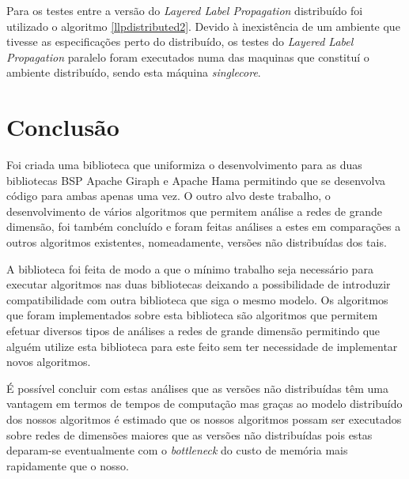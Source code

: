 Para os testes entre a versão do \textit{Layered Label Propagation} distribuído 
foi utilizado o algoritmo \ref{llpdistributed2}. Devido à inexistência de um 
ambiente que tivesse as especificações perto do distribuído, os testes do 
\textit{Layered Label Propagation} paralelo foram executados numa das maquinas 
que constituí o ambiente distribuído, sendo esta máquina \textit{singlecore}.

\chapter{Conclusão}
Foi criada uma biblioteca que uniformiza o desenvolvimento para as duas bibliotecas BSP Apache Giraph e Apache Hama permitindo que se desenvolva código para ambas apenas uma vez. O outro alvo deste trabalho, o desenvolvimento de vários algoritmos que permitem análise a redes de grande dimensão, foi também concluído e foram feitas análises a estes em comparações a outros algoritmos existentes, nomeadamente, versões não distribuídas dos tais.

A biblioteca foi feita de modo a que o mínimo trabalho seja necessário para executar algoritmos nas duas bibliotecas deixando a possibilidade de introduzir compatibilidade com outra biblioteca que siga o mesmo modelo. Os algoritmos que foram implementados sobre esta biblioteca são algoritmos que permitem efetuar diversos tipos de análises a redes de grande dimensão permitindo que alguém utilize esta biblioteca para este feito sem ter necessidade de implementar novos algoritmos.

É possível concluir com estas análises que as versões não distribuídas têm uma vantagem em termos de tempos de computação mas graças ao modelo distribuído dos nossos algoritmos é estimado que os nossos algoritmos possam ser executados sobre redes de dimensões maiores que as versões não distribuídas pois estas deparam-se eventualmente com o \textit{bottleneck} do custo de memória mais rapidamente que o nosso.

